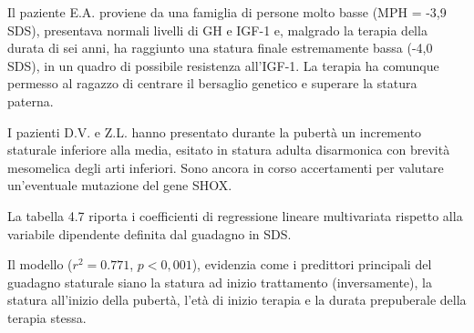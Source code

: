Il paziente E.A. proviene da una famiglia di persone molto basse (MPH = -3,9 SDS), presentava normali livelli di GH e IGF-1 e, malgrado la terapia della durata di sei anni, ha raggiunto una statura finale estremamente bassa (-4,0 SDS), in un quadro di possibile resistenza all'IGF-1. La terapia ha comunque permesso al ragazzo di centrare il bersaglio genetico e superare la statura paterna.

I pazienti D.V. e Z.L. hanno presentato durante la pubertà un incremento staturale inferiore alla media, esitato in statura adulta disarmonica con brevità mesomelica degli arti inferiori. Sono ancora in corso accertamenti per valutare un'eventuale mutazione del gene SHOX. 

  


La tabella 4.7 riporta i coefficienti di regressione lineare multivariata rispetto alla variabile dipendente definita dal guadagno in SDS.

Il modello ($r^2 = 0.771$, $p < 0,001$), evidenzia come i predittori principali del guadagno staturale siano 
la statura ad inizio trattamento (inversamente), la statura all'inizio della pubertà, l'età di inizio terapia e la durata prepuberale della terapia stessa.

